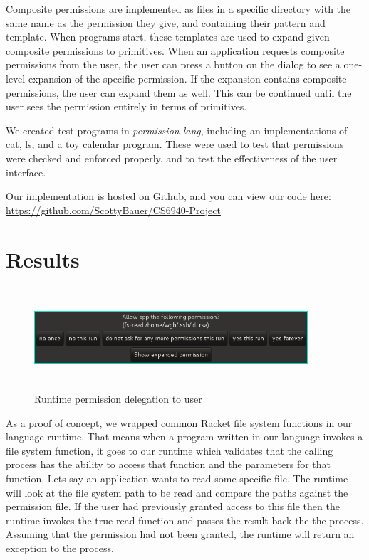 Composite permissions are implemented as files in a specific directory with the same name as the permission they give, and containing their pattern and template.  When programs start, these templates are used to expand given composite permissions to primitives.  When an application requests composite permissions from the user, the user can press a button on the dialog to see a one-level expansion of the specific permission.  If the expansion contains composite permissions, the user can expand them as well.  This can be continued until the user sees the permission entirely in terms of primitives.

We created test programs in \textit{permission-lang}, including an implementations of cat, ls, and a toy calendar program.
These were used to test that permissions were checked and enforced properly, and to test the effectiveness of the user interface.

Our implementation is hosted on Github, and you can view our code here: \url{https://github.com/ScottyBauer/CS6940-Project}


\section{Results}\label{section:ResImp}
\begin{figure}
\centering
\includegraphics[height=1.5in, width=4in]{ask-permission.png}
\caption{Runtime permission delegation to user}
\end{figure}


As a proof of concept, we wrapped common Racket file system functions in our language runtime. That means when a program written in our language invokes a file system function, it goes to our runtime which validates that the calling process has the ability to access that function and the parameters for that function. Lets say an application wants to read some specific file. The runtime will look at the file system path to be read and compare the paths against the permission file. If the user had previously granted access to this file then the runtime invokes the true read function and passes the result back the the process. Assuming that the permission had not been granted, the runtime will return an exception to the process.

